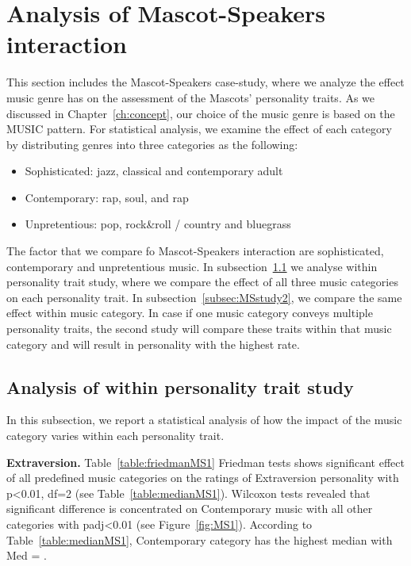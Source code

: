 \section{Analysis of Mascot-Speakers interaction}
\label{sec:m-s}
This section includes the Mascot-Speakers case-study, where we analyze the effect music genre
has on the assessment of the Mascots' personality traits.
As we discussed in Chapter~\ref{ch:concept}, our choice of the music genre is based on the MUSIC pattern.
For statistical analysis, we examine the effect of
each category by distributing genres into three categories as the following:
\begin{itemize}
  \item Sophisticated:  jazz, classical and contemporary adult
  \item Contemporary: rap, soul, and rap
  \item Unpretentious: pop, rock\&roll / country and bluegrass
\end{itemize}

The factor that we compare  fo Mascot-Speakers interaction are sophisticated, contemporary and unpretentious music.
In subsection~\ref{subsec:MSstudy1} we analyse within personality trait study,
where we compare the effect of all three music categories on each personality trait.
In subsection~\ref{subsec:MSstudy2}, we compare the same effect within music category.
In case if one music category conveys multiple personality traits, the second study will compare
these traits within that music category and will result in personality with the highest rate.

\subsection{Analysis of within personality trait study}
\label{subsec:MSstudy1}
In this subsection, we report a statistical analysis of how the impact of the music category varies within each
personality trait.

\par\textbf{Extraversion.} Table~\ref{table:friedmanMS1}
Friedman tests shows significant effect of all predefined music categories on the
ratings of Extraversion personality with p<0.01, df=2 (see Table~\ref{table:medianMS1}).
Wilcoxon tests revealed that significant difference is concentrated on Contemporary music
with all other categories with padj<0.01 (see Figure~\ref{fig:MS1}).
According to Table~\ref{table:medianMS1}, Contemporary category has the highest median with Med = .

